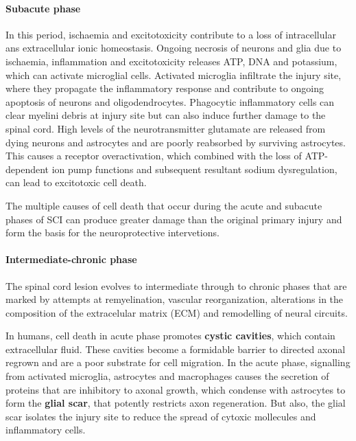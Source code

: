 \documentclass[12pt,article,oneside,a4paper]{memoir}
\begin{document}
\paragraph{Subacute phase}
In this period, ischaemia and excitotoxicity contribute to a loss of
intracellular ans extracellular ionic homeostasis. Ongoing necrosis of neurons
and glia due to ischaemia, inflammation and excitotoxicity releases ATP, DNA
and potassium, which can activate microglial cells. Activated microglia
infiltrate the injury site, where they propagate the inflammatory response and
contribute to ongoing apoptosis of neurons and oligodendrocytes. Phagocytic
inflammatory cells can clear myelini debris at injury site but can also induce
further damage to the spinal cord. High levels of the neurotransmitter
glutamate are released from dying neurons and astrocytes and are poorly
reabsorbed by surviving astrocytes. This causes a receptor overactivation,
which combined with the loss of ATP-dependent ion pump functions and subsequent
resultant sodium dysregulation, can lead to excitotoxic cell death.

The multiple causes of cell death that occur during the acute and subacute
phases of SCI can produce greater damage than the original primary injury and
form the basis for the neuroprotective intervetions.

\paragraph{Intermediate-chronic phase}
The spinal cord lesion evolves to intermediate through to chronic phases that
are marked by attempts at remyelination, vascular reorganization, alterations
in the composition of the extracelular matrix (ECM) and remodelling of neural
circuits.

In humans, cell death in acute phase promotes \textbf{cystic cavities}, which
contain extracellular fluid. These cavities become a formidable barrier to
directed axonal regrown and are a poor substrate for cell migration. In the
acute phase, signalling from activated microglia, astrocytes and macrophages
causes the secretion of proteins that are inhibitory to axonal growth, which
condense with astrocytes to form the \textbf{glial scar}, that potently
restricts axon regeneration. But also, the glial scar isolates the injury site
to reduce the spread of cytoxic mollecules and inflammatory cells.
\end{document}
